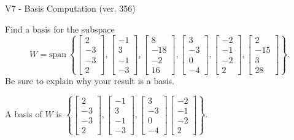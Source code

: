\begin{exercise}
  \begin{exerciseTitle}V7 - Basis Computation (ver. 356)\end{exerciseTitle}
  \begin{exerciseStatement}
    Find a basis for the subspace 
\[W=\mathrm{span}\ \left\{\left[\begin{array}{r}
2 \\
-3 \\
-3 \\
2
\end{array}\right] , \left[\begin{array}{r}
-1 \\
3 \\
-1 \\
-3
\end{array}\right] , \left[\begin{array}{r}
8 \\
-18 \\
-2 \\
16
\end{array}\right] , \left[\begin{array}{r}
3 \\
-3 \\
0 \\
-4
\end{array}\right] , \left[\begin{array}{r}
-2 \\
-1 \\
-2 \\
2
\end{array}\right] , \left[\begin{array}{r}
2 \\
-15 \\
3 \\
28
\end{array}\right]\right\}.\]
 Be sure to explain why your result is a basis.


  \end{exerciseStatement}
  \begin{exerciseAnswer}
   A basis of \(W\) is  \(\left\{\left[\begin{array}{r}
2 \\
-3 \\
-3 \\
2
\end{array}\right] , \left[\begin{array}{r}
-1 \\
3 \\
-1 \\
-3
\end{array}\right] , \left[\begin{array}{r}
3 \\
-3 \\
0 \\
-4
\end{array}\right] \left[\begin{array}{r}
-2 \\
-1 \\
-2 \\
2
\end{array}\right]\right\}\).
  


  \end{exerciseAnswer}
\end{exercise}